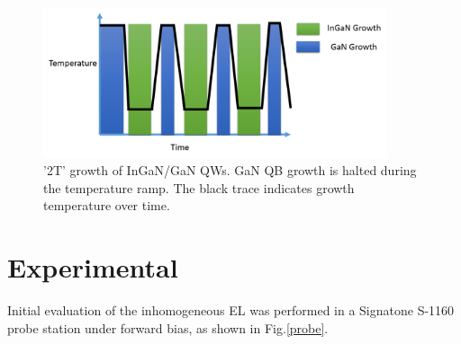 \begin{figure}[!ht]
	\centering
	\includegraphics[width=0.9\textwidth]{Figs/Ch3/2T}
	\caption[h] {'2T' growth of InGaN/GaN QWs. GaN QB growth is halted during the temperature ramp. The black trace indicates growth temperature over time.}
	\label{2T}
\end{figure}

\FloatBarrier 

\section{Experimental}

Initial evaluation of the inhomogeneous EL was performed in a Signatone S-1160 probe station under forward bias, as shown in Fig.\ref{probe}.

